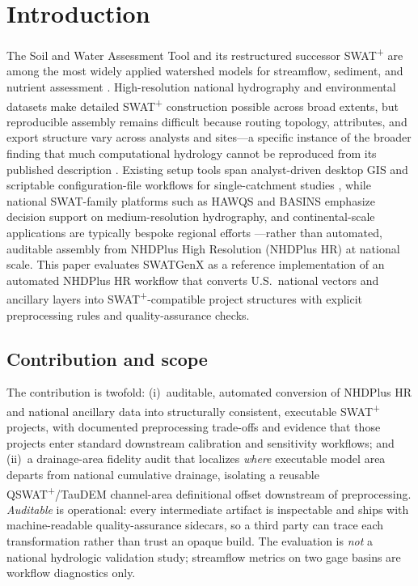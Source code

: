 \section{Introduction}

The Soil and Water Assessment Tool and its restructured successor SWAT\textsuperscript{+} are among the most widely applied watershed models for streamflow, sediment, and nutrient assessment \citep{Arnold1998SWAT, Gassman2007SWAT, Bieger2017SWATPlus}.
High-resolution national hydrography and environmental datasets make detailed SWAT\textsuperscript{+} construction possible across broad extents, but reproducible assembly remains difficult because routing topology, attributes, and export structure vary across analysts and sites---a specific instance of the broader finding that much computational hydrology cannot be reproduced from its published description \citep{Hutton2016Reproducible}.
Existing setup tools span analyst-driven desktop GIS \citep{Dile2016QSWAT} and scriptable configuration-file workflows for single-catchment studies \citep{Chawanda2020SWATPlusAW}, while national SWAT-family platforms such as HAWQS \citep{Yen2016HAWQS} and BASINS \citep{EPABASINSFramework} emphasize decision support on medium-resolution hydrography, and continental-scale applications \citep{Abbaspour2015Europe} are typically bespoke regional efforts \citep{MooreDewald2016RoadToNHDPlus}---rather than automated, auditable assembly from NHDPlus High Resolution (NHDPlus HR) at national scale.
This paper evaluates SWATGenX as a reference implementation of an automated NHDPlus HR workflow that converts U.S.\ national vectors and ancillary layers into SWAT\textsuperscript{+}-compatible project structures with explicit preprocessing rules and quality-assurance checks.

\subsection{Contribution and scope}

The contribution is twofold: (i)~auditable, automated conversion of NHDPlus HR and national ancillary data into structurally consistent, executable SWAT\textsuperscript{+} projects, with documented preprocessing trade-offs and evidence that those projects enter standard downstream calibration and sensitivity workflows; and (ii)~a drainage-area fidelity audit that localizes \emph{where} executable model area departs from national cumulative drainage, isolating a reusable QSWAT\textsuperscript{+}/TauDEM channel-area definitional offset downstream of preprocessing. \emph{Auditable} is operational: every intermediate artifact is inspectable and ships with machine-readable quality-assurance sidecars, so a third party can trace each transformation rather than trust an opaque build. The evaluation is \emph{not} a national hydrologic validation study; streamflow metrics on two gage basins are workflow diagnostics only.

